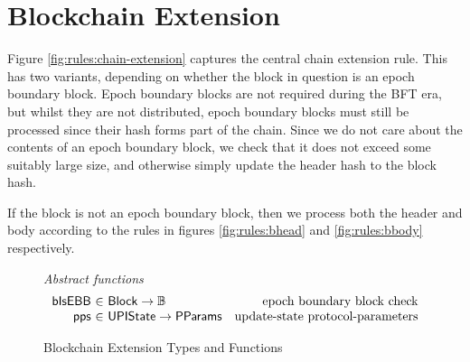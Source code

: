 \documentclass[11pt,a4paper]{article}
\newcommand{\fun}[1]{\mathsf{#1}}
\newcommand{\type}[1]{\mathsf{#1}}
\newcommand{\totalf}{\to}
\newcommand{\Block}{\type{Block}}
\newcommand{\ProtParams}{\type{PParams}} %
\newcommand{\isebbname}{bIsEBB}
\begin{document}
\clearpage

\section{Blockchain Extension}
\label{sec:chain-extension}

\newcommand{\CEEnv}{\type{CEEnv}}
\newcommand{\CEState}{\type{CEState}}

Figure \ref{fig:rules:chain-extension} captures the central chain extension
rule. This has two variants, depending on whether the block in question is an
epoch boundary block. Epoch boundary blocks are not required during the BFT era,
but whilst they are not distributed, epoch boundary blocks must still be
processed since their hash forms part of the chain. Since we do not care about
the contents of an epoch boundary block, we check that it does not exceed some
suitably large size, and otherwise simply update the header hash to the block
hash.

If the block is not an epoch boundary block, then we process both the header and
body according to the rules in figures \ref{fig:rules:bhead} and
\ref{fig:rules:bbody} respectively.

\begin{figure}[ht]
  \emph{Abstract functions}
  \begin{equation*}
    \begin{array}{r@{~\in~}lr}
      \fun{\isebbname} & \Block \totalf \mathbb{B} & \text{epoch boundary block check} \\
      \fun{pps} & \UPIState \totalf \ProtParams & \text{update-state protocol-parameters}
    \end{array}
  \end{equation*}
  \caption{Blockchain Extension Types and Functions}
  \label{fig:defs:chain-extension}
\end{figure}
\end{document}
